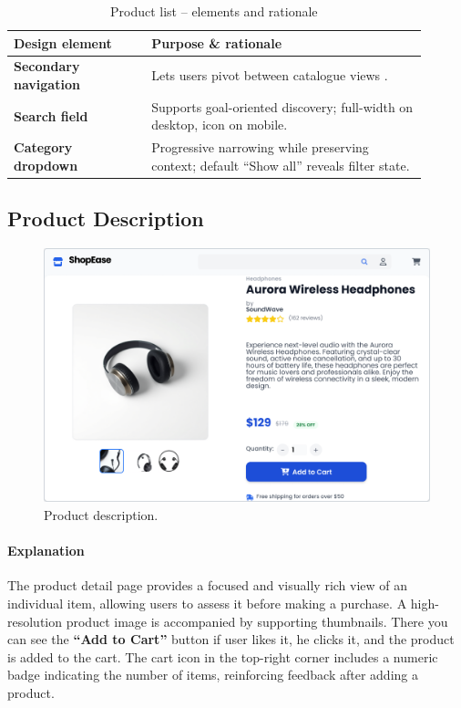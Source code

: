 \documentclass[12pt]{article}
\begin{document}
	\begin{table}[H]
		\centering
		\caption{Product list – elements and rationale}
		\label{tab:product-elements}
		\begin{tabular}{p{0.30\linewidth} p{0.60\linewidth}}
			\hline
			\textbf{Design element} 		 & Purpose \& rationale \\ 	\hline
			\textbf{Secondary navigation}    & Lets users pivot between catalogue views .\\
			\textbf{Search field}            & Supports goal-oriented discovery; full-width on desktop, icon on mobile.\\
			\textbf{Category dropdown}       & Progressive narrowing while preserving context; default “Show all” reveals filter state.\\
			\hline
		\end{tabular}
	\end{table}

	\subsection{Product Description}\label{subsec:product-description}

	\begin{figure}[H]
		\centering
		\includegraphics[width=\linewidth]{pictures/main/Product_Description_Figma}
		\caption{Product description.}
		\label{fig:ui-products_description}
	\end{figure}

	\paragraph{Explanation}
	The product detail page provides a focused and visually rich view of an individual item, allowing users to assess it before making a purchase.
	A high-resolution product image is accompanied by supporting thumbnails.
	There you can see the \textbf{``Add to Cart''} button if user likes it, he clicks it, and the product is added to the cart.
	The cart icon in the top-right corner includes a numeric badge indicating the number of items, reinforcing feedback after adding a product.
\end{document}
